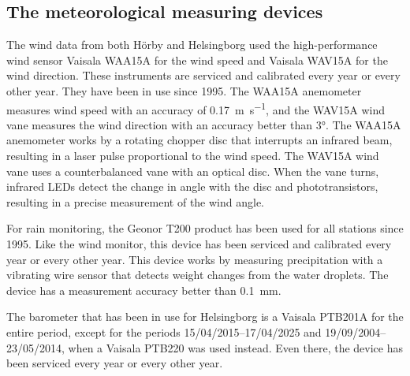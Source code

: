 \subsection{The meteorological measuring devices}
The wind data from both Hörby and Helsingborg used the high-performance wind sensor Vaisala WAA15A for the wind speed and Vaisala WAV15A for the wind direction. These instruments are serviced and calibrated every year or every other year. They have been in use since 1995. The WAA15A anemometer measures wind speed with an accuracy of \SI{0.17}{\m\per\s}, and the WAV15A wind vane measures the wind direction with an accuracy better than \ang{3}\cite{vaisalaWindSetWA152021}. The WAA15A anemometer works by a rotating chopper disc that interrupts an infrared beam, resulting in a laser pulse proportional to the wind speed. The WAV15A wind vane uses a counterbalanced vane with an optical disc. When the vane turns, infrared LEDs detect the change in angle with the disc and phototransistors, resulting in a precise measurement of the wind angle.

For rain monitoring, the Geonor T200 product has been used for all stations since 1995. Like the wind monitor, this device has been serviced and calibrated every year or every other year. This device works by measuring precipitation with a vibrating wire sensor that detects weight changes from the water droplets\cite{vaisalaT200BSeriesAll}. The device has a measurement accuracy better than \SI{0.1}{\mm}.

The barometer that has been in use for Helsingborg is a Vaisala PTB201A for the entire period, except for the periods 15/04/2015–17/04/2025 and 19/09/2004–23/05/2014, when a Vaisala PTB220 was used instead. Even there, the device has been serviced every year or every other year.